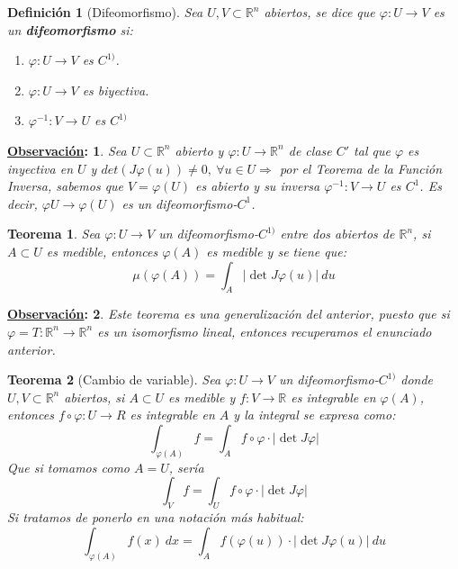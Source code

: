 \documentclass[10pt,a4paper,openright]{book}
\theoremstyle{break}
\newtheorem*{defi}{Definición}
\newtheorem*{theo}{Teorema}
\newtheorem*{obs}{\underline{Observación}:}
\newcommand{\dif}[1]{\ d#1}
\begin{document}
\begin{defi}[Difeomorfismo]
Sea $U, V \subset \mathbb{R}^n$ abiertos, se dice que $\varphi: U \rightarrow V$ es un \textbf{difeomorfismo} si: 
\begin{enumerate}
    \item $\varphi: U \rightarrow V$ es $C^{1)}$.
    \item $\varphi: U \rightarrow V$ es biyectiva. 
    \item $\varphi^{-1}: V \rightarrow U$ es $C^{1)}$
\end{enumerate}
\end{defi}

\begin{obs}
Sea $U \subset \mathbb{R}^n$ abierto y $\varphi: U \rightarrow \mathbb{R}^n$ de clase $C'$ tal que $\varphi$ es inyectiva en $U$ y $det \left(J \varphi \left(u\right) \right) \neq 0,\ \forall u \in U \Rightarrow$ por el Teorema de la Función Inversa, sabemos que $V = \varphi \left(U\right)$ es abierto y su inversa $\varphi^{-1}: V \rightarrow U$ es $C^1$. Es decir, $\varphi U \rightarrow \varphi \left(U\right)$ es un difeomorfismo-$C^1$.
\end{obs}

\begin{theo}
Sea $\varphi: U \rightarrow V$ un difeomorfismo-$C^{1)}$ entre dos abiertos de $\mathbb{R}^n$, si $A \subset U$ es medible, entonces $\varphi \left(A\right)$ es medible y se tiene que:
$$\mu \left(\varphi \left(A\right) \right) = \int_A \lvert \det J \varphi\left(u\right) \rvert \dif{u}$$
\end{theo}

\begin{obs}
Este teorema es una generalización del anterior, puesto que si $\varphi = T: \mathbb{R}^n \rightarrow \mathbb{R}^n$ es un isomorfismo lineal, entonces recuperamos el enunciado anterior.
\end{obs}

\begin{theo}[Cambio de variable]
Sea $\varphi: U \rightarrow V$ un difeomorfismo-$C^{1)}$ donde $U, V\subset \mathbb{R}^n$ abiertos, si $A\subset U$ es medible y $f: V \rightarrow \mathbb{R}$ es integrable en $ \varphi \left(A\right)$, entonces $f \circ \varphi: U \rightarrow R$ es integrable en $A$ y la integral se expresa como:
$$\int_{\varphi \left(A\right)} f = \int_A f \circ \varphi \cdot \lvert \det J \varphi \rvert$$
Que si tomamos como $A= U$, sería
$$\int_V f = \int_U f \circ \varphi \cdot \lvert \det J \varphi \rvert$$
Si tratamos de ponerlo en una notación más habitual: 
$$\int_{\varphi \left(A\right)} f \left(x\right) \dif{x} = \int_A f \left(\varphi \left(u\right)\right) \cdot \lvert \det J \varphi \left(u\right) \rvert \dif{u}$$
\end{theo}
\end{document}
